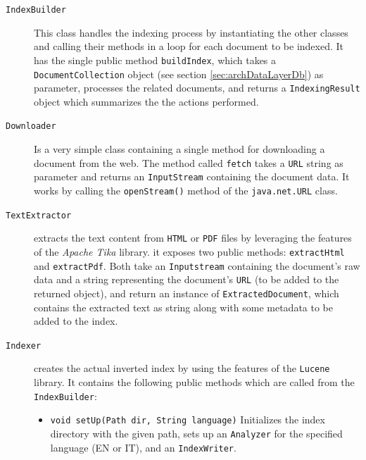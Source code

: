 \documentclass[a4paper]{usiinfbachelorproject}
\begin{document}
    \begin{description}

        \item[\texttt{IndexBuilder}]

            This class handles the indexing process by instantiating the other classes and calling their methods in a loop for 
            each document to be indexed. It has the single public method \texttt{buildIndex}, which takes
            a \texttt{DocumentCollection} object (see section \ref{sec:archDataLayerDb}) as parameter, processes the related
            documents, and returns a \texttt{IndexingResult} object which summarizes the the actions performed. 

        \item[\texttt{Downloader}] Is a very simple class containing a single method for downloading a document from the web.
            The method called \texttt{fetch} takes a \texttt{URL} string as parameter and returns an \texttt{InputStream}
            containing the document data. It works by calling the \texttt{openStream()} method of the 
            \texttt{java.net.URL} class.

        \item[\texttt{TextExtractor}] extracts the text content from \texttt{HTML} or \texttt{PDF} files by
            leveraging the features of the \emph{Apache Tika} library. it exposes two public methods:
            \texttt{extractHtml} and \texttt{extractPdf}. Both take an \texttt{Inputstream} containing the
            document's raw data and a string representing the document's \texttt{URL} (to be added to the returned object),
            and return an instance of \texttt{ExtractedDocument}, which contains the extracted text as string along with some
            metadata to be added to the index.

        \item[\texttt{Indexer}] creates the actual inverted index by using the features of the \texttt{Lucene} library.
            It contains the following public methods which are called from the \texttt{IndexBuilder}:

            \begin{itemize}

                \item \texttt{void setUp(Path dir, String language)} Initializes the index directory with the given path,
                      sets up an \texttt{Analyzer} for the specified language (EN or IT), and an \texttt{IndexWriter}. 


\end{itemize}
\end{description}
\end{document}
